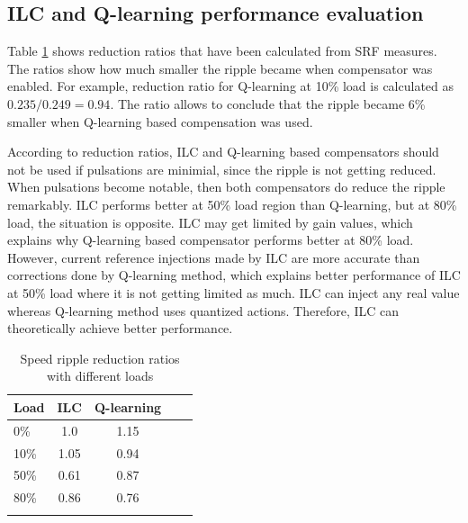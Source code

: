 \subsection{ILC and Q-learning performance evaluation}



Table \ref{Tbl:reduction} shows reduction ratios that have been calculated from SRF measures. The ratios show how much smaller the ripple became when compensator was enabled. For example, reduction ratio for Q-learning at 10\% load is calculated as $0.235 / 0.249 = 0.94$. The ratio allows to conclude that the ripple became 6\% smaller when Q-learning based compensation was used.

According to reduction ratios, ILC and Q-learning based compensators should not be used if pulsations are minimial, since the ripple is not getting reduced. When pulsations become notable, then both compensators do reduce the ripple remarkably. ILC performs better at 50\% load region than Q-learning, but at 80\% load, the situation is opposite. ILC may get limited by gain values, which explains why Q-learning based compensator performs better at 80\% load. However, current reference injections made by ILC are more accurate than corrections done by Q-learning method, which explains better performance of ILC at 50\% load where it is not getting limited as much. ILC can inject any real value whereas Q-learning method uses quantized actions. Therefore, ILC can theoretically achieve better performance.
\begin{table}[htb]
\caption{Speed ripple reduction ratios with different loads}
\centering
\begin{tabular}[t]{lcccc}
\hline
Load & ILC & Q-learning\\
\hline
0\%   & 1.0   & 1.15\\
10\%  & 1.05  & 0.94 \\
50\%  & 0.61  & 0.87 \\
80\%  & 0.86  & 0.76 \\
\hline
\label{Tbl:reduction}
\end{tabular}
\end{table}%

\clearpage
